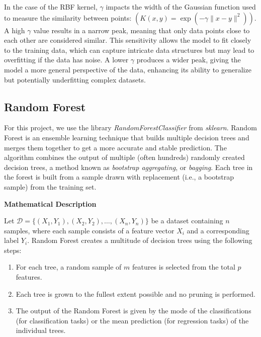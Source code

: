 \documentclass[twocolumn]{article}
\begin{document}
In the case of the RBF kernel, $\gamma$ impacts the width of the Gaussian function used to measure the similarity between points: $(K(x, y) = \exp(-\gamma \| x - y \|^2))$. A high $\gamma$ value results in a narrow peak, meaning that only data points close to each other are considered similar. This sensitivity allows the model to fit closely to the training data, which can capture intricate data structures but may lead to overfitting if the data has noise. A lower $\gamma$ produces a wider peak, giving the model a more general perspective of the data, enhancing its ability to generalize but potentially underfitting complex datasets.

\subsection{Random Forest}
For this project, we use the library \textit{RandomForestClassifier} from \textit{sklearn}.
Random Forest is an ensemble learning technique that builds multiple decision trees and merges them together to get a more accurate and stable prediction. The algorithm combines the output of multiple (often hundreds) randomly created decision trees, a method known as \textit{bootstrap aggregating}, or \textit{bagging}. Each tree in the forest is built from a sample drawn with replacement (i.e., a bootstrap sample) from the training set.

\textbf{\large Mathematical Description}

Let \( \mathcal{D} = \{(X_1, Y_1), (X_2, Y_2), \dots, (X_n, Y_n)\} \) be a dataset containing \( n \) samples, where each sample consists of a feature vector \( X_i \) and a corresponding label \( Y_i \). Random Forest creates a multitude of decision trees using the following steps:

\begin{enumerate}
    \item For each tree, a random sample of \( m \) features is selected from the total \( p \) features.
    \item Each tree is grown to the fullest extent possible and no pruning is performed.
    \item The output of the Random Forest is given by the mode of the classifications (for classification tasks) or the mean prediction (for regression tasks) of the individual trees.
\end{enumerate}
\end{document}
